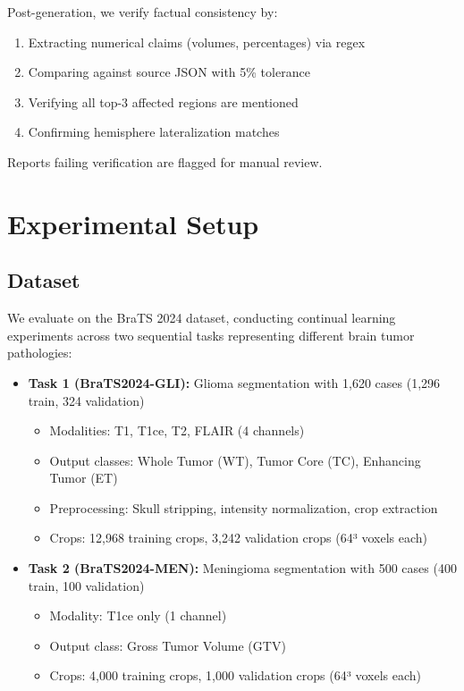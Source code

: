 \documentclass[conference]{IEEEtran}
\begin{document}
Post-generation, we verify factual consistency by:
\begin{enumerate}
\item Extracting numerical claims (volumes, percentages) via regex
\item Comparing against source JSON with 5\% tolerance
\item Verifying all top-3 affected regions are mentioned
\item Confirming hemisphere lateralization matches
\end{enumerate}

Reports failing verification are flagged for manual review.


\section{Experimental Setup}

\subsection{Dataset}

We evaluate on the BraTS 2024 dataset, conducting continual learning experiments across two sequential tasks representing different brain tumor pathologies:

\begin{itemize}
\item \textbf{Task 1 (BraTS2024-GLI):} Glioma segmentation with 1,620 cases (1,296 train, 324 validation)
  \begin{itemize}
  \item Modalities: T1, T1ce, T2, FLAIR (4 channels)
  \item Output classes: Whole Tumor (WT), Tumor Core (TC), Enhancing Tumor (ET)
  \item Preprocessing: Skull stripping, intensity normalization, crop extraction
  \item Crops: 12,968 training crops, 3,242 validation crops (64³ voxels each)
  \end{itemize}

\item \textbf{Task 2 (BraTS2024-MEN):} Meningioma segmentation with 500 cases (400 train, 100 validation)
  \begin{itemize}
  \item Modality: T1ce only (1 channel)
  \item Output class: Gross Tumor Volume (GTV)
  \item Crops: 4,000 training crops, 1,000 validation crops (64³ voxels each)
  \end{itemize}
\end{itemize}
\end{document}
